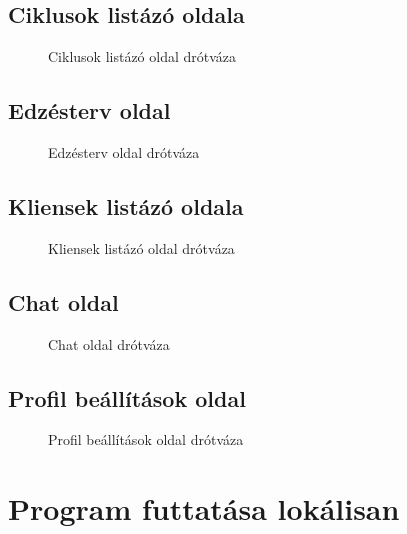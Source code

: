 \subsection{Ciklusok listázó oldala}
\begin{figure}[H]
	\centering
{}	\caption{Ciklusok listázó oldal drótváza}
	\label{fig:cyclespage}
\end{figure}

\subsection{Edzésterv oldal}
\begin{figure}[H]
	\centering
{}	\caption{Edzésterv oldal drótváza}
	\label{fig:workouttable}
\end{figure}

\subsection{Kliensek listázó oldala}
\begin{figure}[H]
	\centering
{}	\caption{Kliensek listázó oldal drótváza}
	\label{fig:clientspagewireframe}
\end{figure}

\subsection{Chat oldal}
\begin{figure}[H]
	\centering
{}	\caption{Chat oldal drótváza}
	\label{fig:chat}
\end{figure}

\subsection{Profil beállítások oldal}
\begin{figure}[H]
	\centering
{}	\caption{Profil beállítások oldal drótváza}
	\label{fig:account}
\end{figure}


\section{Program futtatása lokálisan}

